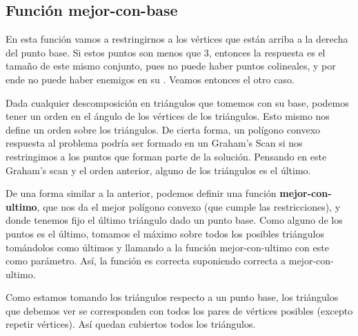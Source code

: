 \subsection{Función mejor-con-base}
\par{
En esta función vamos a restringirnos a los vértices que están arriba a la derecha del punto base.
Si estos puntos son menos que 3, entonces la respuesta es el tamaño de este mismo conjunto, pues no puede haber puntos colineales, y por ende no puede haber enemigos en su .
Veamos entonces el otro caso.} \newline
\par{
Dada cualquier descomposición en triángulos que tomemos con su base, podemos tener un orden en el ángulo de los vértices de los triángulos. Esto mismo nos define un orden sobre los triángulos.
De cierta forma, un polígono convexo respuesta al problema podría ser formado en un Graham's Scan si nos restringimos a los puntos que forman parte de la solución. Pensando en este Graham's scan y el orden anterior, alguno de los triángulos es el último.} \newline
\par{
De una forma similar a la anterior, podemos definir una función \textbf{mejor-con-ultimo}, que nos da el mejor polígono convexo (que cumple las restricciones), y donde tenemos fijo el último triángulo dado un punto base. Como alguno de los puntos es el último, tomamos el máximo sobre todos los posibles triángulos tomándolos como últimos y llamando a la función mejor-con-ultimo con este como parámetro. Así, la función es correcta suponiendo correcta a mejor-con-ultimo.} \newline
\par{
Como estamos tomando los triángulos respecto a un punto base, los triángulos que debemos ver se corresponden con todos los pares de vértices posibles (excepto repetir vértices). Así quedan cubiertos todos los triángulos. } \newline

